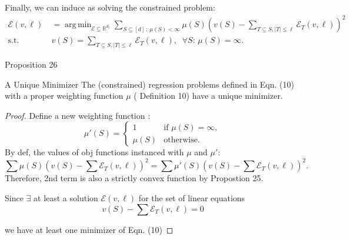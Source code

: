 \documentclass[10pt]{beamer}
\newcommand{\f}{v}
\newcommand{\ex}{\Expl}
\def\Expl{\mathcal{E}}
\DeclareMathOperator*{\argmin}{arg\,min}
\begin{document}
\begin{frame}
    Finally, we can induce as solving the constrained problem:
    \begin{align*}
    \ex(\f, \ell) \ 
    &= \argmin_{\Expl \subseteq \mathbb{R}^{d_\ell} } \sum_{S \subseteq [d]\,:\, \mu(S) < \infty}  \mu(S) \left( \f(S) - \sum_{T \subseteq S , |T| \leq \ell}\Expl_T(\f,\ell) \right)^2 \nonumber \\
    \text{s.t.} \ & \f(S) = \sum_{T \subseteq S , |T| \leq \ell}\Expl_T(\f,\ell), \;\;\forall S :\, \mu(S) = \infty.
    \label{eqn:constrained_weighted_regresion}
    \tag{10}
    \end{align*}
\end{frame}
\begin{frame}{Proposition 26}
    \begin{myaxiombox}{A Unique Minimizer}
        The (constrained) regression problems defined in  Eqn. (10) with a proper weighting function $\mu$ ( Definition 10)
        have a unique minimizer.
    \end{myaxiombox}

\end{frame}
\begin{frame}
    \begin{proof}
    
    Define a new weighting function :
    \[
    \mu'(S) = 
    \begin{cases} 
    1 & \text{if } \mu(S) = \infty, \\
    \mu(S) & \text{otherwise.}
    \end{cases}
    \]
    By def, the values of obj functions instanced with $\mu$ and $\mu'$:
    $$
    \sum  \mu(S) \left( \f(S) - \sum \Expl_T(\f,\ell) \right)^2
    = \sum  \mu'(S) \left( \f(S) - \sum\Expl_T(\f,\ell) \right)^2.
    $$
    Therefore, 2nd term is also a strictly convex function by Propostion 25.
    
    Since $\exists$ at least a solution $\ex(\f,\ell)$ for the set of linear equations \\
    $$\f(S) - \sum\Expl_T(\f,\ell) =0$$
    
    we have at least one minimizer of Eqn. (10)
    \renewcommand{\qedsymbol}{} %
    \end{proof}

\end{frame}
\end{document}
